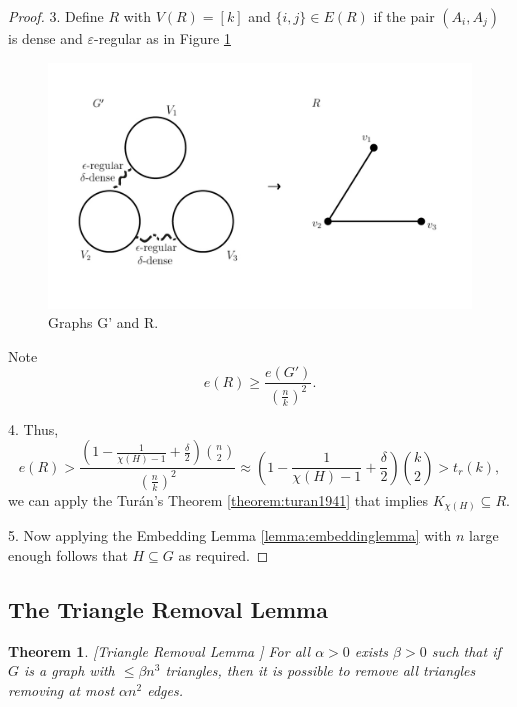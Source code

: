 \documentclass[12pt,twoside,a4paper,bibliography=totocnumbered]{book}
\numberwithin{equation}{section}
\newtheorem{theorem}             {Theorem}[section]
\theoremstyle{remark}
\begin{document}
\begin{proof}
3. Define $R$ with $V(R) = [k]$ and $\{i,j\} \in E(R) $ if  the pair $(A_i, A_j)$ is dense and $\varepsilon$-regular as in Figure \ref{fig:graph-G'-and-R}

\begin{figure}[H]
     \centering
     \includegraphics[scale=1.5]{Figuras/graph-G'-and-R.jpg}
     \caption{Graphs G' and R.}
     \label{fig:graph-G'-and-R}
\end{figure}

Note 
$$e(R) \geq \frac{e(G')}{\left(\frac{n}{k}\right)^2}.$$

4. Thus,
$$e(R) > \frac{\left(1 - \frac{1}{\chi(H) - 1} + \frac{\delta}{2}\right) \binom{n}{2}}{\left(\frac{n}{k}\right)^2} \approx \left( 1 - \frac{1}{\chi(H) - 1} + \frac{\delta}{2}\right) \binom{k}{2}> t_r(k),$$
we can apply the Turán's Theorem \ref{theorem:turan1941} that implies $K_{\chi (H)} \subseteq R$.

5. Now applying the Embedding Lemma \ref{lemma:embeddinglemma} with $n$ large enough follows that $H \subseteq G$ as required.

\end{proof}

\subsection{The Triangle Removal Lemma}
\begin{theorem}\label{lemma:triangleremoval}[{Triangle Removal Lemma \cite{RuSz76}}]
For all $\alpha > 0$ exists $\beta > 0$ such that if $G$ is a graph with $\leq \beta n^3$ triangles, then it is possible to remove all triangles removing at most $\alpha n^2$ edges. 
\end{theorem}
\end{document}
